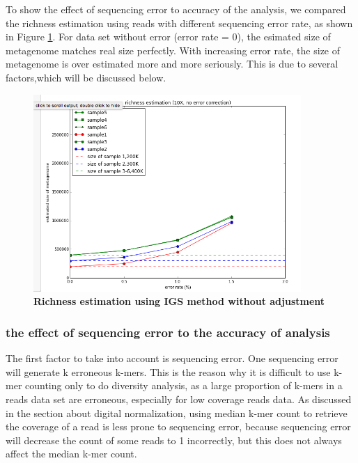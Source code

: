 To show the effect of sequencing error to accuracy of the 
analysis, we compared the richness estimation using reads with different 
sequencing error rate, as shown in Figure \ref{fig:IGS_richness_no_adjustment}. 
For data set without error (error rate = 0), the esimated size of metagenome
matches real size perfectly. With increasing error rate, the size of metagenome
is over estimated more and more seriously. This is due to several factors,which
will be discussed below. 
\begin{figure}[!ht]
 \centerline{\includegraphics[width=4in]{./figures/IGS_richness_no_adjustment.png}}
\caption{\bf Richness estimation using IGS method without adjustment}
\label{fig:IGS_richness_no_adjustment}
\end{figure}

\subsubsection{the effect of sequencing error to the accuracy of analysis}
The first factor to take into account is sequencing error. One sequencing error
will generate k erroneous k-mers. This is the reason why it is difficult to use
k-mer counting only to do diversity analysis, as a large proportion of k-mers
in a reads data set are erroneous, especially for low coverage reads data. As
discussed in the section about digital normalization, using median k-mer count
to retrieve the coverage of a read is less prone to sequencing error, because
sequencing error will decrease the count of some reads to 1 incorrectly, but
this does not always affect the median k-mer count. 

